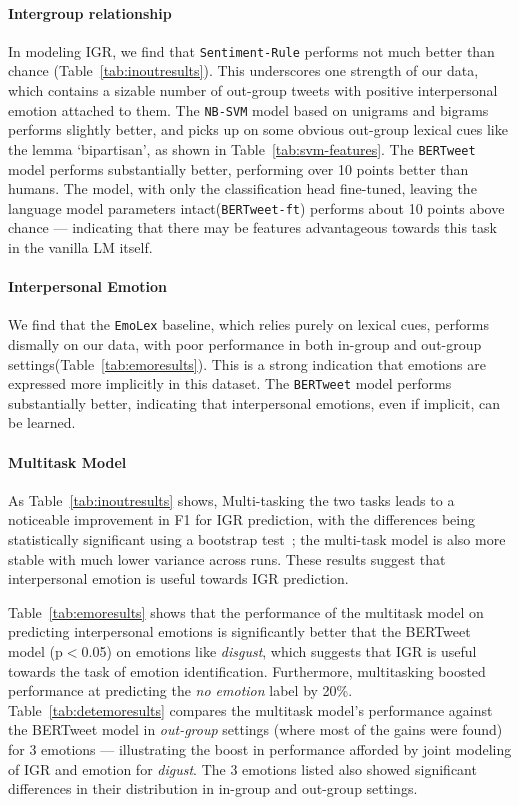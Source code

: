 \paragraph{Intergroup relationship} In modeling IGR, we find that \texttt{Sentiment-Rule} performs not much better than chance (Table~\ref{tab:inoutresults}). This underscores one strength of our data, which contains a sizable number of out-group tweets with positive interpersonal emotion attached to them. The \texttt{NB-SVM} model based on unigrams and bigrams performs slightly better, and picks up on some obvious out-group lexical cues like the lemma `bipartisan', as shown in Table~\ref{tab:svm-features}. The \texttt{BERTweet} model performs substantially better, performing over 10 points better than humans. The model, with only the classification head fine-tuned, leaving the language model parameters intact(\texttt{BERTweet-ft}) performs about 10 points above chance --- indicating that there may be features advantageous towards this task in the vanilla LM itself.

\paragraph{Interpersonal Emotion}

We find that the \texttt{EmoLex} baseline, which relies purely on lexical cues, performs dismally on our data, with poor performance in both in-group and out-group settings(Table~\ref{tab:emoresults}). This is a strong indication that emotions are expressed more implicitly in this dataset. The \texttt{BERTweet} model performs substantially better, indicating that interpersonal emotions, even if implicit, can be learned.

\paragraph{Multitask Model}

As Table~\ref{tab:inoutresults} shows, Multi-tasking the two tasks leads to a noticeable improvement in F1 for IGR prediction, with the differences being statistically significant using a bootstrap test~\cite[p$<$0.05;][]{berg-kirkpatrick-etal-2012-empirical}; the multi-task model is also more stable with much lower variance across runs. These results suggest that interpersonal emotion is useful towards IGR prediction.

Table~\ref{tab:emoresults} shows that the performance of the multitask model on predicting interpersonal emotions is significantly better that the BERTweet model (p$<$0.05) on emotions like \emph{disgust}, which suggests that IGR is useful towards the task of emotion identification. Furthermore, multitasking boosted performance at predicting the \emph{no emotion} label by 20\%.  Table~\ref{tab:detemoresults} compares the multitask model's performance against the BERTweet model in \emph{out-group} settings (where most of the gains were found) for 3 emotions --- illustrating the boost in performance afforded by joint modeling of IGR and emotion for \emph{digust}. The 3 emotions listed also showed significant differences in their distribution in in-group and out-group settings.

